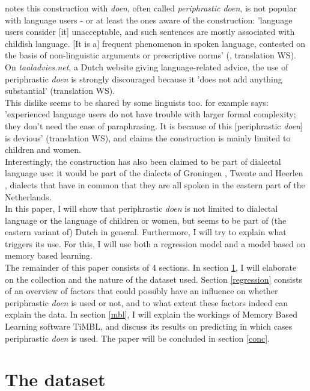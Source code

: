 \documentclass[12pt]{article}
\begin{document}
\citet{g83} notes this construction with \emph{doen}, often called \emph{periphrastic doen}, is not popular with language users - or at least the ones aware of the construction: 'language users consider [it] unacceptable, and such sentences are mostly associated with childish language. [It is a] frequent phenomenon in spoken language, contested on the basis of non-linguistic arguments or prescriptive norms' (\citealp[p. 58]{g83}, translation WS). On \emph{taaladvies.net}, a Dutch website giving language-related advice, the use of periphrastic \emph{doen} is strongly discouraged because it 'does not add anything substantial' (translation WS).\\\indent
This dislike seems to be shared by some linguists too. \citet[p. 121]{d94} for example says: 'experienced language users do not have trouble with larger formal complexity; they don't need the ease of paraphrasing. It is because of this [periphrastic \emph{doen}] is devious' (translation WS), and \citet[p. 153]{n62} claims the construction is mainly limited to children and women.\\\indent
Interestingly, the construction has also been claimed to be part of dialectal language use: it would be part of the dialects of Groningen \citep{tl53}, Twente \citep{n62} and Heerlen \citep{c94}, dialects that have in common that they are all spoken in the eastern part of the Netherlands.\\\indent
In this paper, I will show that periphrastic \emph{doen} is not limited to dialectal language or the language of children or women,  but seems to be part of (the eastern variant of) Dutch in general. Furthermore, I will try to explain what triggers its use. For this, I will use both a regression model and a model based on memory based learning.\\\indent
The remainder of this paper consists of 4 sections. In section \ref{data}, I will elaborate on the collection and the nature of the dataset used. Section \ref{regression} consists of an overview of factors that could possibly have an influence on whether periphrastic \emph{doen} is used or not, and to what extent these factors indeed can explain the data. In section \ref{mbl}, I will explain the workings of Memory Based Learning software TiMBL, and discuss its results on predicting in which cases periphrastic \emph{doen} is used. The paper will be concluded in section \ref{conc}.

\section{The dataset} \label{data}
\end{document}
